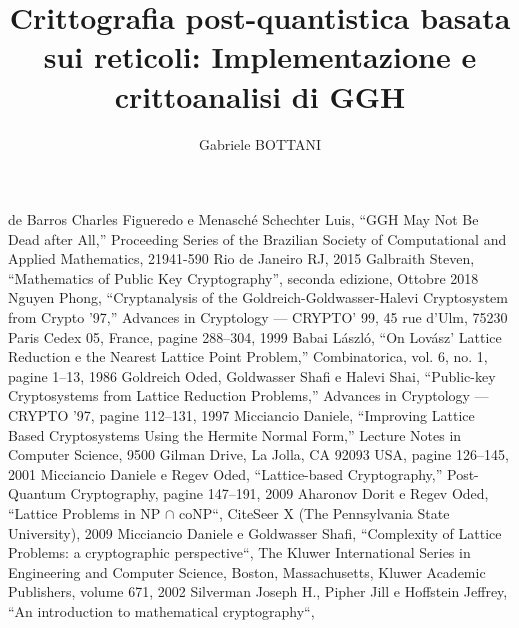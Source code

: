 \documentclass[a4paper,12pt]{report}
\theoremstyle{definition}
\begin{document}
\title{Crittografia post-quantistica basata sui reticoli: Implementazione e crittoanalisi di GGH}
\author{Gabriele BOTTANI}

% 
%
\beforepreface
\afterpreface
% 
% 

%

%

%

%

%
%
\begin{thebibliography}{}
    de Barros Charles Figueredo e Menasché Schechter Luis, “GGH May Not Be Dead after All,” 
    Proceeding Series of the Brazilian Society of Computational and Applied Mathematics, 
    21941-590 Rio de Janeiro RJ, 2015
    Galbraith Steven, “Mathematics of Public Key Cryptography”, seconda edizione, Ottobre 2018
    Nguyen Phong, “Cryptanalysis of the Goldreich-Goldwasser-Halevi Cryptosystem from 
    Crypto ’97,” Advances in Cryptology — CRYPTO’ 99, 45 rue d’Ulm, 75230 Paris Cedex 05, 
    France, pagine 288–304, 1999
    Babai László, “On Lovász’ Lattice Reduction e the Nearest Lattice Point Problem,” 
    Combinatorica, vol. 6, no. 1, pagine 1–13, 1986
    Goldreich Oded, Goldwasser Shafi e Halevi Shai,  “Public-key Cryptosystems from 
    Lattice Reduction Problems,” Advances in Cryptology — CRYPTO ’97, pagine 112–131, 1997
    Micciancio Daniele,  “Improving Lattice Based Cryptosystems Using the Hermite 
    Normal Form,” Lecture Notes in Computer Science, 9500 Gilman Drive, La Jolla, 
    CA 92093 USA, pagine 126–145, 2001
    Micciancio Daniele e Regev Oded, “Lattice-based Cryptography,” Post-Quantum 
    Cryptography, pagine 147–191, 2009
    Aharonov Dorit e Regev Oded, “Lattice Problems in NP $\cap$ coNP“, 
    CiteSeer X (The Pennsylvania State University), 2009
    Micciancio Daniele e Goldwasser Shafi, 
    “Complexity of Lattice Problems: a cryptographic perspective“,
    The Kluwer International Series in Engineering and Computer Science, Boston, Massachusetts,
    Kluwer Academic Publishers, volume 671, 2002
    Silverman Joseph H., Pipher Jill e Hoffstein Jeffrey, “An introduction to mathematical cryptography“,

\end{thebibliography}
\end{document}
